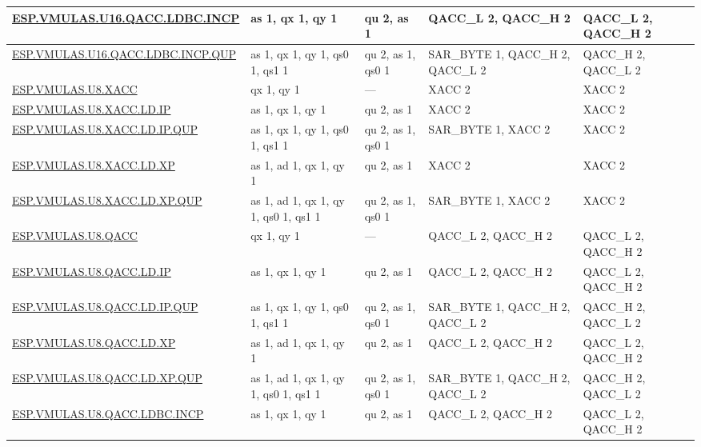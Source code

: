 \begin{longtable}[c]{|l|m{2.5cm}|m{2.5cm}|m{2.5cm}|m{2.5cm}|}
    \hyperref[instruction:ESPVMULASU16QACCLDBCINCP]{ESP.VMULAS.U16.QACC.LDBC.INCP} & as 1, qx 1, qy 1 & qu 2, as 1 & QACC\_L 2, QACC\_H 2 & QACC\_L 2, QACC\_H 2\\\hline
    \hyperref[instruction:ESPVMULASU16QACCLDBCINCPQUP]{ESP.VMULAS.U16.QACC.LDBC.INCP.QUP} & as 1, qx 1, qy 1, qs0 1, qs1 1 & qu 2, as 1, qs0 1 & SAR\_BYTE 1, QACC\_H 2, QACC\_L 2 & QACC\_H 2, QACC\_L 2\\\hline
    \hyperref[instruction:ESPVMULASU8XACC]{ESP.VMULAS.U8.XACC} & qx 1, qy 1 & — & XACC 2 & XACC 2\\\hline
    \hyperref[instruction:ESPVMULASU8XACCLDIP]{ESP.VMULAS.U8.XACC.LD.IP} & as 1, qx 1, qy 1 & qu 2, as 1 & XACC 2 & XACC 2\\\hline
    \hyperref[instruction:ESPVMULASU8XACCLDIPQUP]{ESP.VMULAS.U8.XACC.LD.IP.QUP} & as 1, qx 1, qy 1, qs0 1, qs1 1 & qu 2, as 1, qs0 1 & SAR\_BYTE 1, XACC 2 & XACC 2\\\hline
    \hyperref[instruction:ESPVMULASU8XACCLDXP]{ESP.VMULAS.U8.XACC.LD.XP} & as 1, ad 1, qx 1, qy 1 & qu 2, as 1 & XACC 2 & XACC 2\\\hline
    \hyperref[instruction:ESPVMULASU8XACCLDXPQUP]{ESP.VMULAS.U8.XACC.LD.XP.QUP} & as 1, ad 1, qx 1, qy 1, qs0 1, qs1 1 & qu 2, as 1, qs0 1 & SAR\_BYTE 1, XACC 2 & XACC 2\\\hline
    \hyperref[instruction:ESPVMULASU8QACC]{ESP.VMULAS.U8.QACC} & qx 1, qy 1 & — & QACC\_L 2, QACC\_H 2 & QACC\_L 2, QACC\_H 2\\\hline
    \hyperref[instruction:ESPVMULASU8QACCLDIP]{ESP.VMULAS.U8.QACC.LD.IP} & as 1, qx 1, qy 1 & qu 2, as 1 & QACC\_L 2, QACC\_H 2 & QACC\_L 2, QACC\_H 2\\\hline
    \hyperref[instruction:ESPVMULASU8QACCLDIPQUP]{ESP.VMULAS.U8.QACC.LD.IP.QUP} & as 1, qx 1, qy 1, qs0 1, qs1 1 & qu 2, as 1, qs0 1 & SAR\_BYTE 1, QACC\_H 2, QACC\_L 2 & QACC\_H 2, QACC\_L 2\\\hline
    \hyperref[instruction:ESPVMULASU8QACCLDXP]{ESP.VMULAS.U8.QACC.LD.XP} & as 1, ad 1, qx 1, qy 1 & qu 2, as 1 & QACC\_L 2, QACC\_H 2 & QACC\_L 2, QACC\_H 2\\\hline
    \hyperref[instruction:ESPVMULASU8QACCLDXPQUP]{ESP.VMULAS.U8.QACC.LD.XP.QUP} & as 1, ad 1, qx 1, qy 1, qs0 1, qs1 1 & qu 2, as 1, qs0 1 & SAR\_BYTE 1, QACC\_H 2, QACC\_L 2 & QACC\_H 2, QACC\_L 2\\\hline
    \hyperref[instruction:ESPVMULASU8QACCLDBCINCP]{ESP.VMULAS.U8.QACC.LDBC.INCP} & as 1, qx 1, qy 1 & qu 2, as 1 & QACC\_L 2, QACC\_H 2 & QACC\_L 2, QACC\_H 2\\\hline

\end{longtable}
